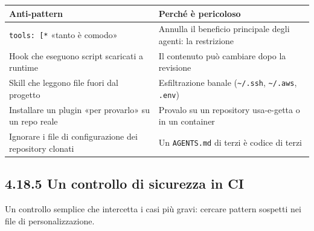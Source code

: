\documentclass[
  italian,
  10pt,
]{book}
\newcounter{none} %
\begin{document}
{\def\LTcaptype{none} %
\begin{longtable}[]{@{}
  >{\raggedright\arraybackslash}p{}
  >{\raggedright\arraybackslash}p{}@{}}
\toprule\noalign{}
\begin{minipage}[b]{\linewidth}\raggedright
Anti-pattern
\end{minipage} & \begin{minipage}[b]{\linewidth}\raggedright
Perché è pericoloso
\end{minipage} \\
\midrule\noalign{}
\endhead
\bottomrule\noalign{}
\endlastfoot
\texttt{tools:\ {[}\textquotesingle{}*\textquotesingle{}{]}} «tanto è
comodo» & Annulla il beneficio principale degli agenti: la
restrizione \\
Hook che eseguono script scaricati a runtime & Il contenuto può cambiare
dopo la revisione \\
Skill che leggono file fuori dal progetto & Esfiltrazione banale
(\texttt{\textasciitilde{}/.ssh}, \texttt{\textasciitilde{}/.aws},
\texttt{.env}) \\
Installare un plugin «per provarlo» su un repo reale & Provalo su un
repository usa-e-getta o in un container \\
Ignorare i file di configurazione dei repository clonati & Un
\texttt{AGENTS.md} di terzi è codice di terzi \\
\end{longtable}
}

\subsection{4.18.5 Un controllo di sicurezza in
CI}\label{un-controllo-di-sicurezza-in-ci}

Un controllo semplice che intercetta i casi più gravi: cercare pattern
sospetti nei file di personalizzazione.
\end{document}
